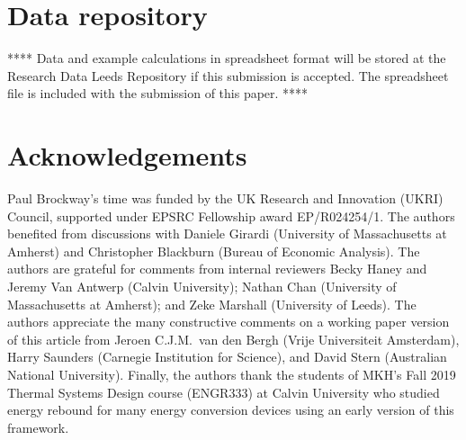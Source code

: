 \documentclass[12pt]{article}\usepackage[]{graphicx}\usepackage[]{xcolor}
\begin{document}
\section*{Data repository}
\label{sec:data_repository}


**** Data and example calculations in spreadsheet format will be stored at the
Research Data Leeds Repository if this submission is accepted.
The spreadsheet file is included with the submission of this paper. ****




\section*{Acknowledgements}
\label{sec:acknowledgements}




Paul Brockway’s time was funded by the UK Research and Innovation (UKRI)
Council, supported under EPSRC Fellowship award EP/R024254/1.
The authors benefited from discussions with
Daniele Girardi (University of Massachusetts at Amherst) and
Christopher Blackburn (Bureau of Economic Analysis).
The authors are grateful for comments from internal reviewers
Becky Haney and Jeremy Van Antwerp (Calvin University);
Nathan Chan (University of Massachusetts at Amherst); and
Zeke Marshall (University of Leeds).
The authors appreciate the many constructive comments
on a working paper version of this article from
Jeroen C.J.M.\ van den Bergh (Vrije Universiteit Amsterdam),
Harry Saunders (Carnegie Institution for Science), and
David Stern (Australian National University).
Finally, the authors thank the students of MKH's Fall 2019
Thermal Systems Design course (ENGR333) at Calvin University
who studied energy rebound for many energy conversion devices
using an early version of this framework.
\end{document}

